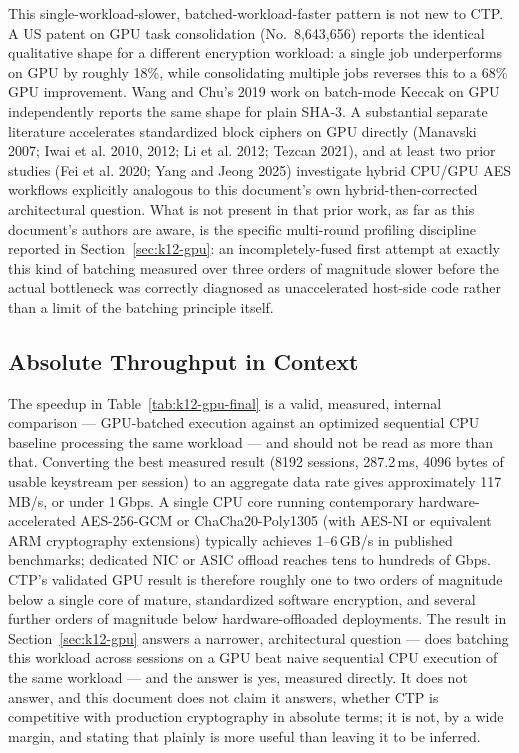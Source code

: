 \documentclass[twocolumn,10pt,journal,compsoc]{IEEEtran}
\begin{document}
This single-workload-slower, batched-workload-faster pattern is not new to CTP. A US patent on GPU task consolidation (No.\ 8,643,656) reports the identical qualitative shape for a different encryption workload: a single job underperforms on GPU by roughly 18\%, while consolidating multiple jobs reverses this to a 68\% GPU improvement. Wang and Chu's 2019 work on batch-mode Keccak on GPU independently reports the same shape for plain SHA-3. A substantial separate literature accelerates standardized block ciphers on GPU directly (Manavski 2007; Iwai et al. 2010, 2012; Li et al. 2012; Tezcan 2021), and at least two prior studies (Fei et al. 2020; Yang and Jeong 2025) investigate hybrid CPU/GPU AES workflows explicitly analogous to this document's own hybrid-then-corrected architectural question. What is not present in that prior work, as far as this document's authors are aware, is the specific multi-round profiling discipline reported in Section~\ref{sec:k12-gpu}: an incompletely-fused first attempt at exactly this kind of batching measured over three orders of magnitude slower before the actual bottleneck was correctly diagnosed as unaccelerated host-side code rather than a limit of the batching principle itself.

\subsection{Absolute Throughput in Context}
\label{sec:absolute-throughput}
The speedup in Table~\ref{tab:k12-gpu-final} is a valid, measured, internal comparison --- GPU-batched execution against an optimized sequential CPU baseline processing the same workload --- and should not be read as more than that. Converting the best measured result (8192 sessions, 287.2\,ms, 4096 bytes of usable keystream per session) to an aggregate data rate gives approximately 117\,MB/s, or under 1\,Gbps. A single CPU core running contemporary hardware-accelerated AES-256-GCM or ChaCha20-Poly1305 (with AES-NI or equivalent ARM cryptography extensions) typically achieves 1--6\,GB/s in published benchmarks; dedicated NIC or ASIC offload reaches tens to hundreds of Gbps. CTP's validated GPU result is therefore roughly one to two orders of magnitude below a single core of mature, standardized software encryption, and several further orders of magnitude below hardware-offloaded deployments. The result in Section~\ref{sec:k12-gpu} answers a narrower, architectural question --- does batching this workload across sessions on a GPU beat naive sequential CPU execution of the same workload --- and the answer is yes, measured directly. It does not answer, and this document does not claim it answers, whether CTP is competitive with production cryptography in absolute terms; it is not, by a wide margin, and stating that plainly is more useful than leaving it to be inferred.
\end{document}

